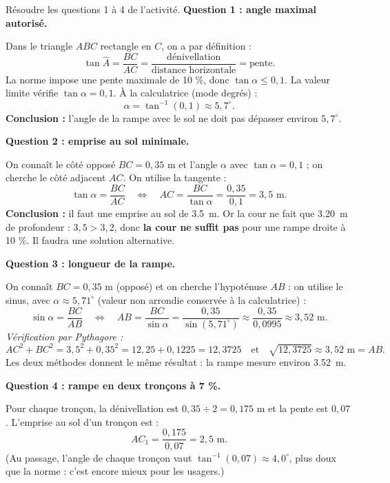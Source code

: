 \documentclass[11pt]{article}
\begin{document}
\begin{exoresolu}
Résoudre les questions 1 à 4 de l'activité.
\tcblower
\textbf{Question 1 : angle maximal autorisé.}

Dans le triangle $ABC$ rectangle en $C$, on a par définition :
\[ \tan \widehat{A} = \dfrac{BC}{AC} = \dfrac{\text{dénivellation}}{\text{distance horizontale}} = \text{pente}. \]
La norme impose une pente maximale de 10 \%, donc $\tan \alpha \leq 0{,}1$. La valeur limite vérifie $\tan \alpha = 0{,}1$. À la calculatrice (mode degrés) :
\[ \alpha = \tan^{-1}(0{,}1) \approx 5{,}7^{\circ}. \]
\textbf{Conclusion :} l'angle de la rampe avec le sol ne doit pas dépasser environ $5{,}7^{\circ}$.

\medskip
\textbf{Question 2 : emprise au sol minimale.}

On connaît le côté opposé $BC = 0{,}35$ m et l'angle $\alpha$ avec $\tan \alpha = 0{,}1$ ; on cherche le côté adjacent $AC$. On utilise la tangente :
\[ \tan \alpha = \dfrac{BC}{AC} \quad \Longleftrightarrow \quad AC = \dfrac{BC}{\tan \alpha} = \dfrac{0{,}35}{0{,}1} = 3{,}5 \text{ m}. \]
\textbf{Conclusion :} il faut une emprise au sol de \SI{3,5}{m}. Or la cour ne fait que \SI{3,20}{m} de profondeur : $3{,}5 > 3{,}2$, donc \textbf{la cour ne suffit pas} pour une rampe droite à 10 \%. Il faudra une solution alternative.

\medskip
\textbf{Question 3 : longueur de la rampe.}

On connaît $BC = 0{,}35$ m (opposé) et on cherche l'hypoténuse $AB$ : on utilise le sinus, avec $\alpha \approx 5{,}71^{\circ}$ (valeur non arrondie conservée à la calculatrice) :
\[ \sin \alpha = \dfrac{BC}{AB} \quad \Longleftrightarrow \quad AB = \dfrac{BC}{\sin \alpha} = \dfrac{0{,}35}{\sin(5{,}71^{\circ})} \approx \dfrac{0{,}35}{0{,}0995} \approx 3{,}52 \text{ m}. \]
\emph{Vérification par Pythagore :}
\[ AC^2 + BC^2 = 3{,}5^2 + 0{,}35^2 = 12{,}25 + 0{,}1225 = 12{,}3725 \quad \text{et} \quad \sqrt{12{,}3725} \approx 3{,}52 \text{ m} = AB. \]
Les deux méthodes donnent le même résultat : la rampe mesure environ \SI{3,52}{m}.

\medskip
\textbf{Question 4 : rampe en deux tronçons à 7 \%.}

Pour chaque tronçon, la dénivellation est $0{,}35 \div 2 = 0{,}175$ m et la pente est $0{,}07$. L'emprise au sol d'un tronçon est :
\[ AC_1 = \dfrac{0{,}175}{0{,}07} = 2{,}5 \text{ m}. \]
(Au passage, l'angle de chaque tronçon vaut $\tan^{-1}(0{,}07) \approx 4{,}0^{\circ}$, plus doux que la norme : c'est encore mieux pour les usagers.)


\end{exoresolu}
\end{document}
